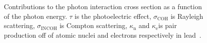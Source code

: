 \begin{figure}[!ht]
    \begin{center}
    \end{center}
        \caption[Contributions to the photon interaction cross section]
        {\small Contributions to the photon interaction cross section as a function of the photon energy.  $\tau$ is the photoelectric effect, $\sigma_{\mathrm{COH}}$ is Rayleigh scattering, $\sigma_{\mathrm{INCOH}}$ is Compton scattering, $\kappa_{\mathrm n}$ and $\kappa_{\mathrm e}$is pair production off of atomic nuclei and electrons respectively in lead~\cite{:/content/aip/journal/jpcrd/9/4/10.1063/1.555629}. 
}
            \label{Photon}
\end{figure}

